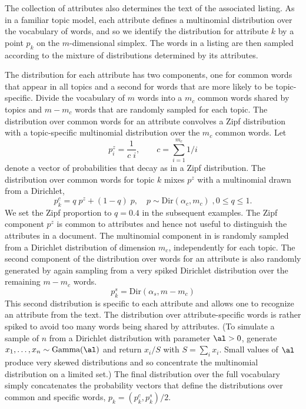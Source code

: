 \documentclass[12pt]{article}
\begin{document}
The collection of attributes also determines the text of the associated listing.  As in a familiar topic model, each attribute defines a multinomial distribution over the vocabulary of words, and so we identify the distribution for attribute $k$ by a point $p_k$ on the $m$-dimensional simplex.  The words in a listing are then sampled according to the mixture of distributions determined by its attributes.  


The distribution for each attribute has two components, one for common words that appear in all topics and a second for words that are more likely to be topic-specific.  Divide the vocabulary of $m$ words into a $m_c$ common words shared by topics and $m - m_c$ words that are randomly sampled for each topic.  The distribution over common words for an attribute convolves a Zipf distribution with a topic-specific multinomial distribution over the $m_c$ common words. Let 
\begin{equation*}
     p^z_i = \frac{1}{c\;i}, \qquad c = \sum_{i=1}^{m_c} 1/i 
\end{equation*}
denote a vector of probabilities that decay as in a Zipf distribution. The distribution over common words for topic $k$ mixes $p^z$ with a multinomial drawn from a Dirichlet,
\begin{equation}
  p^c_k = q \; p^z + (1-q) \; p,  \quad p \sim \mbox{Dir}(\alpha_c,m_c) \;, 0 \le q \le 1.
  \label{eq:pck}
\end{equation}
We set the Zipf proportion to $q = 0.4$ in the subsequent examples.  The Zipf component $p^z$ is common to attributes and hence not useful to distinguish the attributes in a document. The multinomial component in  is randomly sampled from a Dirichlet distribution of dimension $m_c$, independently for each topic.  The second component of the distribution over words for an attribute is also randomly generated by again sampling from a very spiked Dirichlet distribution over the remaining $m-m_c$ words. 
 \begin{equation*}
     p^s_k =  \mbox{Dir}(\alpha_s,m-m_c)
\end{equation*}
This second distribution is specific to each attribute and allows one to recognize an attribute from the text.  The distribution over attribute-specific words is rather spiked to avoid too many words being shared by attributes.  
 (To simulate a sample of $n$ from a Dirichlet distribution with parameter $\al>0$, generate $x_1,\ldots,x_n \sim \mbox{Gamma}(\al)$ and return $x_i/S$ with $S = \sum_i x_i$.  Small values of $\al$ produce very skewed distributions and so concentrate the multinomial distribution on a limited set.)  
The final distribution over the full vocabulary simply concatenates the probability vectors that define the distributions over common and specific words, $p_k = (p_k^c, p_k^s)/2$.
\end{document}
